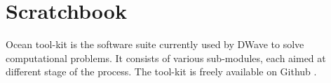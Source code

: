 \chapter{Scratchbook}
Ocean tool-kit is the software suite currently used by DWave to solve computational problems. It consists of various sub-modules, each aimed at different stage of the process. The tool-kit is freely available on Github \cite{DWGitHub}.